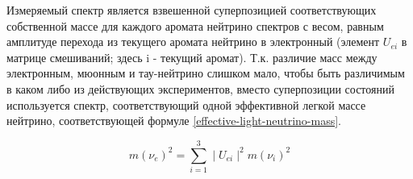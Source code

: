 \documentclass[a4paper,14pt]{extreport}
\begin{document}
Измеряемый спектр является взвешенной суперпозицией соответствующих собственной массе для каждого аромата нейтрино спектров с весом, равным амплитуде перехода из текущего аромата нейтрино в электронный (элемент $ U_{e i} $ в матрице смешиваний; здесь i - текущий аромат). Т.к. различие масс между электронным, мюонным и тау-нейтрино слишком мало, чтобы быть различимым в каком либо из действующих экспериментов, вместо суперпозиции состояний используется спектр, соответствующий одной эффективной легкой массе нейтрино, соответствующей формуле \ref{effective-light-neutrino-mass}.

\begin{equation}\label{effective-light-neutrino-mass}
   m(\nu_{e})^2 = \sum_{i=1}^{3} \mid U_{e i} \mid^2m(\nu_{i})^2  
\end{equation}
\end{document}
